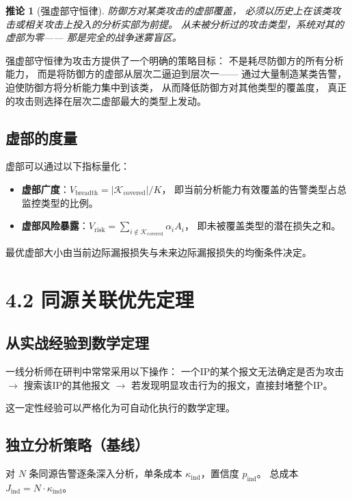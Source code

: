\documentclass[11pt,a4paper]{article}
\newtheorem{corollary}{推论}[section]
\begin{document}
\begin{corollary}[强虚部守恒律]\label{thm:strong}
防御方对某类攻击的虚部覆盖，
必须以历史上在该类攻击或相关攻击上投入的分析实部为前提。
从未被分析过的攻击类型，系统对其的虚部为零——
那是完全的战争迷雾盲区。
\end{corollary}

强虚部守恒律为攻击方提供了一个明确的策略目标：
不是耗尽防御方的所有分析能力，
而是将防御方的虚部从层次二逼迫到层次一——
通过大量制造某类告警，
迫使防御方将分析能力集中到该类，
从而降低防御方对其他类型的覆盖度，
真正的攻击则选择在层次二虚部最大的类型上发动。

\subsection{虚部的度量}

虚部可以通过以下指标量化：
\begin{itemize}
    \item \textbf{虚部广度}：$V_{\text{breadth}} = |\mathcal{K}_{\text{covered}}| / K$，
          即当前分析能力有效覆盖的告警类型占总监控类型的比例。
    \item \textbf{虚部风险暴露}：$V_{\text{risk}} = \sum_{i \notin \mathcal{K}_{\text{covered}}} \alpha_i A_i$，
          即未被覆盖类型的潜在损失之和。
\end{itemize}

最优虚部大小由当前边际漏报损失与未来边际漏报损失的均衡条件决定。

\section{4.2 同源关联优先定理}

\subsection{从实战经验到数学定理}

一线分析师在研判中常常采用以下操作：
一个IP的某个报文无法确定是否为攻击 $\rightarrow$
搜索该IP的其他报文 $\rightarrow$
若发现明显攻击行为的报文，直接封堵整个IP。

这一定性经验可以严格化为可自动化执行的数学定理。

\subsection{独立分析策略（基线）}

对 $N$ 条同源告警逐条深入分析，单条成本 $\kappa_{\text{ind}}$，置信度 $p_{\text{ind}}$。
总成本 $J_{\text{ind}} = N \cdot \kappa_{\text{ind}}$。
\end{document}
